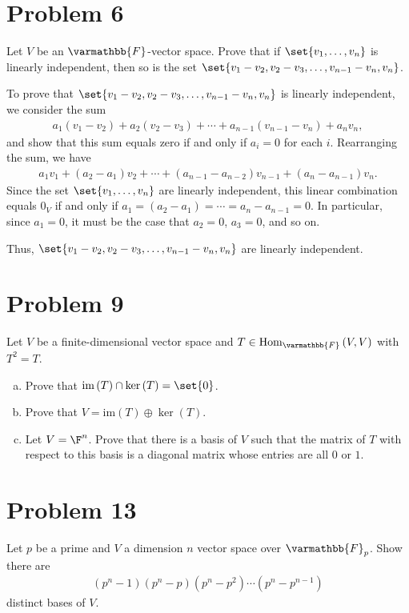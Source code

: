 \documentclass[10pt]{mypackage}
\renewcommand*{\mathbb}[1]{\varmathbb{#1}}
\begin{document}
\section{Problem 6}%
\begin{problem}
  Let $V$ be an $\mathbb{F}$-vector space. Prove that if $\set{v_1,\dots,v_n}$ is linearly independent, then so is the set $\set{v_1-v_2,v_2-v_3,\dots,v_{n-1}-v_{n},v_n}$.
\end{problem}
\begin{solution}
  To prove that $\set{v_1-v_2,v_2-v_3,\dots,v_{n-1}-v_{n},v_n}$ is linearly independent, we consider the sum
  \begin{align*}
    a_1\left(v_1 - v_2\right) + a_2\left(v_2 - v_3\right) + \cdots + a_{n-1}\left(v_{n-1} - v_n\right) + a_nv_n,
  \end{align*}
  and show that this sum equals zero if and only if $a_i = 0$ for each $i$. Rearranging the sum, we have
  \begin{align*}
    a_1v_1 + \left(a_2 - a_1\right)v_2 + \cdots + \left(a_{n-1} - a_{n-2}\right)v_{n-1} + \left(a_{n}-a_{n-1}\right)v_n.
  \end{align*}
  Since the set $\set{v_1,\dots,v_n}$ are linearly independent, this linear combination equals $0_V$ if and only if $a_1 = \left(a_2 - a_1\right) = \cdots = a_{n} - a_{n-1} = 0$. In particular, since $a_1 = 0$, it must be the case that $a_2 = 0$, $a_3 = 0$, and so on.\newline

  Thus, $\set{v_{1} - v_2,v_2 - v_3,\dots,v_{n-1}-v_n,v_n}$ are linearly independent.
\end{solution}
\section{Problem 9}%
\begin{problem}
  Let $V$ be a finite-dimensional vector space and $T\in \text{Hom}_{\mathbb{F}}\left(V,V\right)$ with $T^2 = T$.
  \begin{enumerate}[(a)]
    \item Prove that $\text{im}\left(T\right)\cap \ker\left(T\right) = \set{0}$.
    \item Prove that $V = \text{im}(T)\oplus \ker(T)$.
    \item Let $V = \F^n$. Prove that there is a basis of $V$ such that the matrix of $T$ with respect to this basis is a diagonal matrix whose entries are all $0$ or $1$.
  \end{enumerate}
\end{problem}

\section{Problem 13}%
\begin{problem}
  Let $p$ be a prime and $V$ a dimension $n$ vector space over $\mathbb{F}_p$. Show there are
  \begin{align*}
    \left(p^n-1\right)\left(p^n - p\right)\left(p^n - p^2\right)\cdots \left(p^n - p^{n-1}\right)
  \end{align*}
  distinct bases of $V$.
\end{problem}
\end{document}
